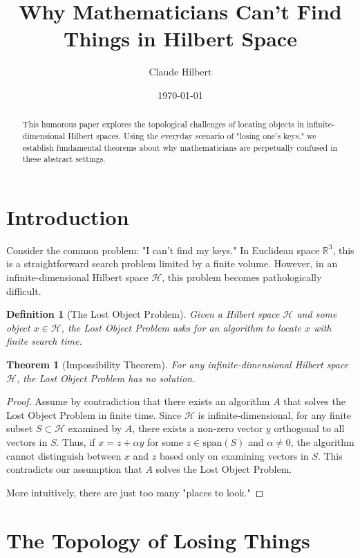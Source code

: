 \documentclass{article}
\title{Why Mathematicians Can't Find Things in Hilbert Space}
\author{Claude Hilbert}
\date{\today}
\newtheorem{theorem}{Theorem}
\newtheorem{definition}{Definition}
\begin{document}
\maketitle

\begin{abstract}
    This humorous paper explores the topological challenges of locating objects in infinite-dimensional Hilbert spaces. Using the everyday scenario of "losing one's keys," we establish fundamental theorems about why mathematicians are perpetually confused in these abstract settings.
\end{abstract}

\section{Introduction}

Consider the common problem: "I can't find my keys." In Euclidean space $\mathbb{R}^3$, this is a straightforward search problem limited by a finite volume. However, in an infinite-dimensional Hilbert space $\mathcal{H}$, this problem becomes pathologically difficult.

\begin{definition}[The Lost Object Problem]
    Given a Hilbert space $\mathcal{H}$ and some object $x \in \mathcal{H}$, the Lost Object Problem asks for an algorithm to locate $x$ with finite search time.
\end{definition}

\begin{theorem}[Impossibility Theorem]
    For any infinite-dimensional Hilbert space $\mathcal{H}$, the Lost Object Problem has no solution.
\end{theorem}

\begin{proof}
    Assume by contradiction that there exists an algorithm $A$ that solves the Lost Object Problem in finite time. Since $\mathcal{H}$ is infinite-dimensional, for any finite subset $S \subset \mathcal{H}$ examined by $A$, there exists a non-zero vector $y$ orthogonal to all vectors in $S$. Thus, if $x = z + \alpha y$ for some $z \in \text{span}(S)$ and $\alpha \neq 0$, the algorithm cannot distinguish between $x$ and $z$ based only on examining vectors in $S$. This contradicts our assumption that $A$ solves the Lost Object Problem.
    
    More intuitively, there are just too many "places to look."
\end{proof}

\section{The Topology of Losing Things}
\end{document}
